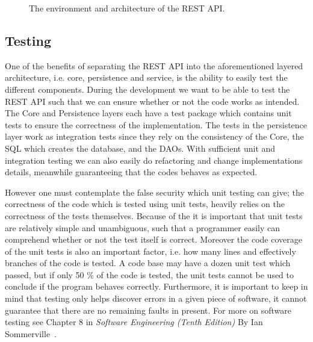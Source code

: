 \begin{figure}[h]
    \centering
    
    \caption{The environment and architecture of the REST API.}
    \label{fig:rest-architecture}
\end{figure}


\subsection{Testing}
One of the benefits of separating the REST API into the aforementioned layered architecture, i.e. core, persistence and service, is the ability to easily test the different components.
During the development we want to be able to test the REST API such that we can ensure whether or not the code works as intended.
The Core and Persistence layers each have a test package which contains unit tests to ensure the correctness of the implementation.
The tests in the persistence layer work as integration tests since they rely on the consistency of the Core, the SQL which creates the database, and the DAOs.
With sufficient unit and integration testing we can also easily do refactoring and change implementations details, meanwhile guaranteeing that the codes behaves as expected.

However one must contemplate the false security which unit testing can give; the correctness of the code which is tested using unit tests, heavily relies on the correctness of the tests themselves.
Because of the it is important that unit tests are relatively simple and unambiguous, such that a programmer easily can comprehend whether or not the test itself is correct.
Moreover the code coverage of the unit tests is also an important factor, i.e. how many lines and effectively branches of the code is tested.
A code base may have a dozen unit test which passed, but if only 50 \% of the code is tested, the unit tests cannot be used to conclude if the program behaves correctly.
Furthermore, it is important to keep in mind that testing only helps discover errors in a given piece of software, it cannot guarantee that there are no remaining faults in present. For more on software testing see Chapter 8 in \textit{Software Engineering (Tenth Edition)} By Ian Sommerville~\cite[Chapter~8]{SEBOOK}.
